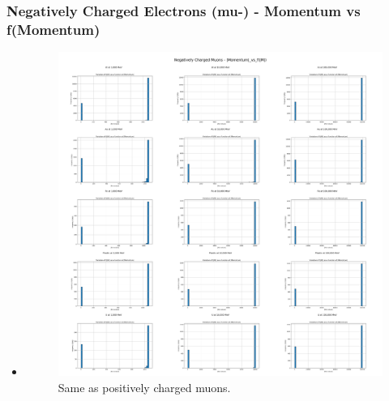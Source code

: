 \documentclass[aspectratio-169]{beamer}
\begin{document}
\begin{frame}
\frametitle{Negatively Charged Electrons (mu-) - Momentum vs f(Momentum)}
\begin{itemize}
    \item 
    \begin{minipage}{0.5\textwidth}
        \begin{figure}
            \centering
            \includegraphics[width=\textwidth]{Combined Plots/|Momentum|_vs_f(|M|)_mu-.png}
            \footnotesize{Same as positively charged muons.}
        \end{figure}
    \end{minipage}
\end{itemize}
\end{frame}

\end{document}

